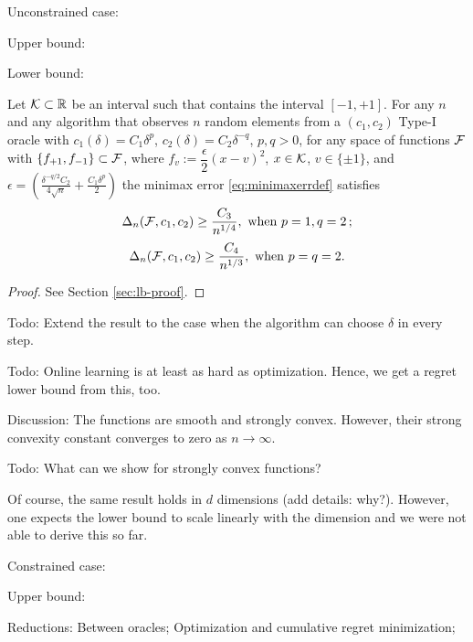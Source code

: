 
Unconstrained case:

Upper bound: 

Lower bound:
\begin{theorem}
Let $\mathcal{K}\subset \mathbb{R}$ be an interval such that contains the interval $[-1,+1]$.
 For any $n$ and any algorithm that observes $n$ random elements from a $(c_1,c_2)$ Type-I oracle 
 with $c_1(\delta) = C_1 \delta^p$, $c_2(\delta) = C_2 \delta^{-q}$, $p,q>0$,
 for any space of functions $\mathcal{F}$ with $\{f_{+1}, f_{-1} \}\subset \mathcal{F}$, 
 where $f_v:= \dfrac{\epsilon}{2} (x - v)^2$, $x\in \mathcal{K}$, $v\in \{\pm 1\}$,
and $\epsilon = \left(\frac{\delta^{-q/2}C_2}{4\sqrt{n}} + \frac{C_1\delta^p}{2}\right)$ 
 the minimax error \eqref{eq:minimaxerrdef} satisfies 
\[
\Delta_n(\mathcal{F}, c_1,c_2) \ge \dfrac{C_3}{ n^{1/4}}, \text{ when } p=1, q=2\,; 
\]
 \[
 \Delta_n(\mathcal{F}, c_1,c_2) \ge \dfrac{C_4}{ n^{1/3}},  \text{ when } p=q=2.
 \]
\end{theorem}
\begin{proof}
 See Section \ref{sec:lb-proof}.
\end{proof}
Todo: Extend the result to the case when the algorithm can choose $\delta$ in every step.

Todo: Online learning is at least as hard as optimization. Hence, we get a regret lower bound from this, too.

Discussion: The functions are smooth and strongly convex.
However, their strong convexity constant converges to zero as $n\to\infty$.

Todo: What can we show for strongly convex functions?

Of course, the same result holds in $d$ dimensions (add details: why?). However, one expects the lower bound to scale linearly with the dimension and we were not able to derive this so far.

Constrained case:

Upper bound: 

Reductions:
Between oracles;
Optimization and cumulative regret minimization;


